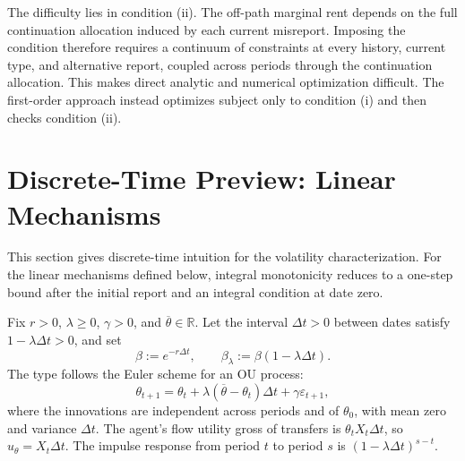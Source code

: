 \documentclass[12pt]{article}
\begin{document}
The difficulty lies in condition (ii). The off-path marginal rent
depends on the full continuation allocation induced by each current
misreport. Imposing the condition therefore requires a continuum of
constraints at every history, current type, and alternative report,
coupled across periods through the continuation allocation. This makes
direct analytic and numerical optimization difficult. The first-order
approach instead optimizes subject only to condition (i) and then
checks condition (ii). 


\section{Discrete-Time Preview: Linear Mechanisms}
\label{sec:discrete-early}

This section gives discrete-time intuition for the volatility
characterization. For the linear mechanisms defined below, integral
monotonicity reduces to a one-step bound after the initial report and
an integral condition at date zero.

Fix \(r>0\), \(\lambda\geq0\), \(\gamma>0\), and
\(\overline\theta\in\mathbb R\). Let the interval \(\Delta t>0\) between dates satisfy
\(1-\lambda\Delta t>0\), and set
\[
  \beta:=e^{-r\Delta t},
  \qquad
  \beta_\lambda:=\beta(1-\lambda\Delta t).
\]
The type follows the Euler scheme for an OU process:
\[
  \theta_{t+1}
  =
  \theta_t+\lambda(\overline\theta-\theta_t)\Delta t
  +\gamma\varepsilon_{t+1},
\]
where the innovations are independent across periods and of
\(\theta_0\), with mean zero and variance \(\Delta t\). The agent's flow
utility gross of transfers is \(\theta_tX_t\Delta t\), so \(u_\theta=X_t\Delta t\). The
impulse response from period \(t\) to period \(s\) is
\((1-\lambda\Delta t)^{s-t}\).
\end{document}

